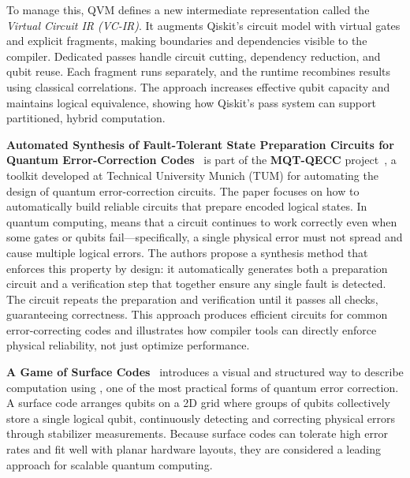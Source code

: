 To manage this, QVM defines a new intermediate representation called the \emph{Virtual Circuit IR (VC-IR)}. It augments Qiskit’s circuit model with virtual gates and explicit fragments, making boundaries and dependencies visible to the compiler. Dedicated passes handle circuit cutting, dependency reduction, and qubit reuse. Each fragment runs separately, and the runtime recombines results using classical correlations. The approach increases effective qubit capacity and maintains logical equivalence, showing how Qiskit’s pass system can support partitioned, hybrid computation.

\vspace{1em}

\textbf{Automated Synthesis of Fault-Tolerant State Preparation Circuits for Quantum Error-Correction Codes}~\cite{peham2025automated} is part of the \textbf{MQT-QECC} project~\cite{wille2024mqt}, a toolkit developed at Technical University Munich (TUM) for automating the design of quantum error-correction circuits. The paper focuses on how to automatically build reliable circuits that prepare encoded logical states. In quantum computing,  means that a circuit continues to work correctly even when some gates or qubits fail—specifically, a single physical error must not spread and cause multiple logical errors. The authors propose a synthesis method that enforces this property by design: it automatically generates both a preparation circuit and a verification step that together ensure any single fault is detected. The circuit repeats the preparation and verification until it passes all checks, guaranteeing correctness. This approach produces efficient circuits for common error-correcting codes and illustrates how compiler tools can directly enforce physical reliability, not just optimize performance.


\vspace{1em}

\textbf{A Game of Surface Codes}~\cite{litinski2019game} introduces a visual and structured way to describe computation using , one of the most practical forms of quantum error correction. A surface code arranges qubits on a 2D grid where groups of qubits collectively store a single logical qubit, continuously detecting and correcting physical errors through stabilizer measurements. Because surface codes can tolerate high error rates and fit well with planar hardware layouts, they are considered a leading approach for scalable quantum computing.

